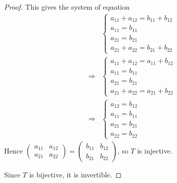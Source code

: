 \documentclass{article}
\begin{document}
\begin{proof}
This gives the system of equation
\begin{align*}
& \begin{cases} a_{11}+a_{12} = b_{11}+b_{12} \\ a_{11} = b_{11} \\ a_{21} = b_{21} \\ a_{21}+a_{22} = b_{21}+b_{22} \end{cases} \\
\Rightarrow & \begin{cases} a_{11}+a_{12} = a_{11}+b_{12} \\ a_{11} = b_{11} \\ a_{21} = b_{21} \\ a_{21}+a_{22} = a_{21}+b_{22} \end{cases} \\
\Rightarrow & \begin{cases} a_{12} = b_{12} \\ a_{11} = b_{11} \\ a_{21} = b_{21} \\ a_{22} = b_{22} \end{cases}
\end{align*}
Hence $\begin{pmatrix} a_{11} & a_{12} \\ a_{21} & a_{22} \end{pmatrix} = \begin{pmatrix} b_{11} & b_{12} \\ b_{21} & b_{22} \end{pmatrix}$, so $T$ is injective.

Since $T$ is bijective, it is invertible.
\bigskip


\end{proof}
\end{document}
